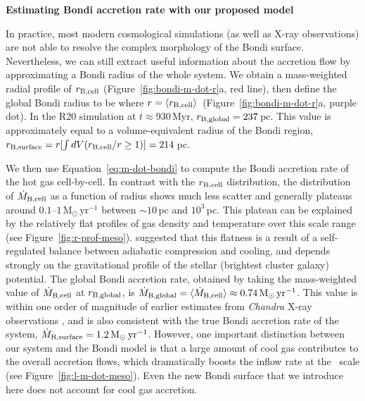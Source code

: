 \centerline{\textbf{Estimating Bondi accretion rate with our proposed model}}

In practice, most modern cosmological simulations (as well as X-ray observations) are not able to resolve the complex morphology of the Bondi surface.
Nevertheless, we can still extract useful information about the accretion flow by approximating a Bondi radius of the whole system.
We obtain a mass-weighted radial profile of $r_{\rm B,cell}$ (Figure~\ref{fig:bondi-m-dot-r}a, red line), then define the global Bondi radius to be where $r = \langle r_{\rm B,cell} \rangle$\ (Figure~\ref{fig:bondi-m-dot-r}a, purple dot).
In the R20 simulation at $t\approx930$\,Myr, $r_{\rm B,global}=237$\,pc.
This value is approximately equal to a volume-equivalent radius of the Bondi region, $r_{\rm B,surface} = r[\int dV(r_{\rm B,cell}/r\geq 1)] = 214$\,pc.

We then use Equation~\ref{eq:m-dot-bondi} to compute the Bondi accretion rate of the hot gas cell-by-cell.
In contrast with the $r_{\rm B,cell}$ distribution, the distribution of $\dot{M}_{\rm B,cell}$ as a function of radius shows much less scatter and generally plateaus around $0.1$--$1\,\mathrm{M_{\odot}\,yr^{-1}}$ between $\sim10$\,pc and $10^3$\,pc.
This plateau can be explained by the relatively flat profiles of gas density and temperature over this scale range (see Figure~\ref{fig:r-prof-meso}).
\citet{li_simulating_2012} suggested that this flatness is a result of a self-regulated balance between adiabatic compression and cooling, and depends strongly on the gravitational profile of the stellar (brightest cluster galaxy) potential.
The global Bondi accretion rate, obtained by taking the mass-weighted value of $\dot{M}_{\rm B,cell}$ at $r_{\rm B,global}$, is $\dot{M}_{\rm B,global} = \langle \dot{M}_{\rm B,cell} \rangle \approx 0.74\,\mathrm{M_{\odot}\,yr^{-1}}$.
This value is within one order of magnitude of earlier estimates from \textit{Chandra} X-ray observations \citep{di_matteo_accretion_2003, russell_inside_2015}, and is also consistent with the true Bondi accretion rate of the system, $\dot{M}_{\rm B,surface} = 1.2\,\mathrm{M_{\odot}\,yr^{-1}}$.
However, one important distinction between our system and the Bondi model is that a large amount of cool gas contributes to the overall accretion flows, which dramatically boosts the inflow rate at the \rb\ scale (see Figure~\ref{fig:l-m-dot-meso}).
Even the new Bondi surface that we introduce here does not account for cool gas accretion.

